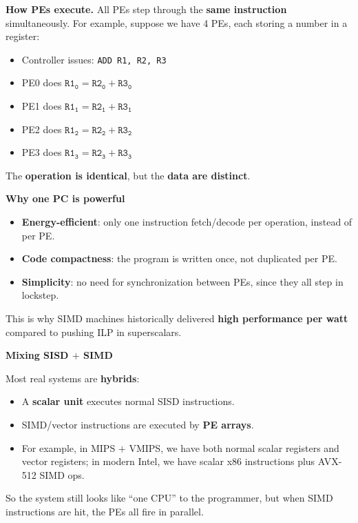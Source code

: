 \highspace
\textcolor{Green3}{ \textbf{How PEs execute.}} All PEs step through the \textbf{same instruction} simultaneously. For example, suppose we have 4 PEs, each storing a number in a register:
\begin{itemize}
    \item Controller issues: \texttt{ADD R1, R2, R3}
    \item PE0 does $\texttt{R1}_{\texttt{0}} = \texttt{R2}_{\texttt{0}} + \texttt{R3}_{\texttt{0}}$
    \item PE1 does $\texttt{R1}_{\texttt{1}} = \texttt{R2}_{\texttt{1}} + \texttt{R3}_{\texttt{1}}$
    \item PE2 does $\texttt{R1}_{\texttt{2}} = \texttt{R2}_{\texttt{2}} + \texttt{R3}_{\texttt{2}}$
    \item PE3 does $\texttt{R1}_{\texttt{3}} = \texttt{R2}_{\texttt{3}} + \texttt{R3}_{\texttt{3}}$
\end{itemize}
The \textbf{operation is identical}, but the \textbf{data are distinct}.

\highspace
\begin{flushleft}
    \textcolor{Green3}{ \textbf{Why one PC is powerful}}
\end{flushleft}
\begin{itemize}
    \item \textbf{Energy-efficient}: only one instruction fetch/decode per operation, instead of per PE.
    \item \textbf{Code compactness}: the program is written once, not duplicated per PE.
    \item \textbf{Simplicity}: no need for synchronization between PEs, since they all step in lockstep.
\end{itemize}
This is why SIMD machines historically delivered \textbf{high performance per watt} compared to pushing ILP in superscalars.

\highspace
\begin{flushleft}
    \textcolor{Green3}{ \textbf{Mixing SISD $+$ SIMD}}
\end{flushleft}
Most real systems are \textbf{hybrids}:
\begin{itemize}
    \item A \textbf{scalar unit} executes normal SISD instructions.
    \item SIMD/vector instructions are executed by \textbf{PE arrays}.
    \item For example, in MIPS $+$ VMIPS, we have both normal scalar registers and vector registers; in modern Intel, we have scalar x86 instructions plus AVX-512 SIMD ops.
\end{itemize}
So the system still looks like ``one CPU'' to the programmer, but when SIMD instructions are hit, the PEs all fire in parallel.

